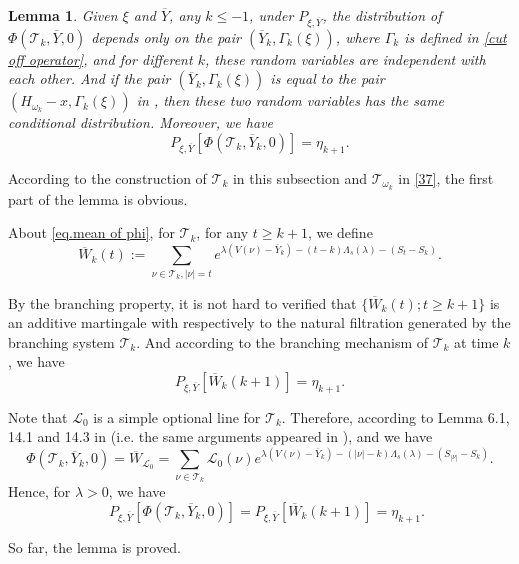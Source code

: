 \documentclass[]{article}
\makeatletter
\numberwithin{equation}{section}
\renewenvironment{proof}[1][\proofname]{%
	\par\pushQED{\qed}\normalfont%
	\topsep6\p@\@plus6\p@\relax
	\trivlist\item[\hskip\labelsep\bfseries#1\@addpunct{.}]%
	\ignorespaces
}{%
	\popQED\endtrivlist\@endpefalse
}
\theoremstyle{thmstyleone}%
\theoremstyle{thmstyletwo}%
\theoremstyle{thmstylethree}%
\theoremstyle{thmstylefour}%
\newtheorem{lemma}{Lemma}
\theoremstyle{thmstylefive}%
\theoremstyle{thmstylesix}%
\makeatother
\begin{document}
	
	\begin{lemma}\label{mean of Phi}
		Given $\xi$ and $\overline{Y}$, any $k\leqslant -1$, under $P_{\xi,\overline{Y}}$, the distribution of $\Phi(\mathcal{T}_k,\overline{Y},0)$ depends only on the pair $(\overline{Y}_k,\Gamma_k(\xi))$, where $\Gamma_k$ is defined in \cref{cut off operator}, and for different $k$, these random variables are independent with each other.
		And if the pair $ (\overline{Y}_k,\Gamma_k(\xi)) $ is equal to the pair $ (H_{\omega_k}-x,\Gamma_k(\xi)) $ in , then these two random variables has the same conditional distribution.
		Moreover, we have
		\begin{equation}\label{eq.mean of phi}
			P_{\xi,\overline{Y}} \left[\Phi(\mathcal{T}_k,\overline{Y}_k,0)\right] = \eta_{k+1}.
		\end{equation}
	\end{lemma}
	
	\begin{proof}[Proof of \Cref{mean of Phi}]
		According to the construction of $\mathcal{T}_k$ in this subsection and $\mathcal{T}_{\omega_k}$ in \cref{37}, the first part of the lemma is obvious.
		
		About \cref{eq.mean of phi}, for $\mathcal{T}_k$, for any $t\geqslant k+1$, we define
		\begin{equation}
			\overline{W}_k(t):=\sum_{\nu\in \mathcal{T}_k,|\nu|=t}
			e^{\lambda(V(\nu)-\overline{Y}_k) - (t-k)\Lambda_s(\lambda)-(S_t-S_k)}.
		\end{equation}
		
		By the branching property,
		it is not hard to verified that $\{\overline{W}_k(t);t\geqslant k+1\}$ is an additive martingale with respectively to the natural filtration generated by the branching system $\mathcal{T}_k$.
		And according to the branching mechanism of $\mathcal{T}_k$ at time $k$, we have
		\begin{equation}
			P_{\xi,\overline{Y}} [\overline{W}_k(k+1)] = \eta_{k+1}.
		\end{equation}
		
		Note that $\mathcal{L}_0$ is a simple optional line for $\mathcal{T}_k$. Therefore,
		according to Lemma 6.1, 14.1 and 14.3 in \cite{Biggins2004} (i.e. the same arguments appeared in ),
		and we have \[\Phi(\mathcal{T}_k,\overline{Y}_k,0) = \overline{W}_{\mathcal{L}_0} = \sum_{\nu\in\mathcal{T}_k} \mathcal{L}_0(\nu) e^{\lambda(V(\nu)-\overline{Y}_k)-(|\nu|-k)\Lambda_s(\lambda)-(S_{|\nu|}-S_k)}. \]
		Hence, for $\lambda>0$, we have
		\[ \quad P_{\xi,\overline{Y}} [\Phi(\mathcal{T}_k,\overline{Y}_k,0)] = P_{\xi,\overline{Y}} [\overline{W}_k(k+1)] = \eta_{k+1}.
		\]
		
		So far, the lemma is proved.
	\end{proof}
	
\end{document}
